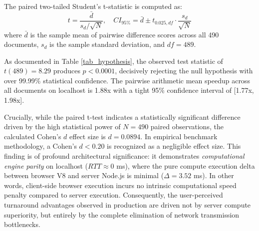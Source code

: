 \documentclass[journal]{IEEEtran}
\begin{document}
The paired two-tailed Student's t-statistic is computed as:
\begin{equation}
t = \frac{\bar{d}}{s_d / \sqrt{N}}, \quad CI_{95\%} = \bar{d} \pm t_{0.025, df} \cdot \frac{s_d}{\sqrt{N}}
\end{equation}
where $\bar{d}$ is the sample mean of pairwise difference scores across all 490 documents, $s_d$ is the sample standard deviation, and $df = 489$.

\begin{table}[!t]
\centering
\caption{Statistical Hypothesis Testing and Speedup Proofs}
\label{tab_hypothesis}
\end{table}

As documented in Table \ref{tab_hypothesis}, the observed test statistic of $t(489) = 8.29$ produces $p < 0.0001$, decisively rejecting the null hypothesis with over 99.99\% statistical confidence. The pairwise arithmetic mean speedup across all documents on localhost is 1.88x with a tight 95\% confidence interval of [1.77x, 1.98x].

Crucially, while the paired t-test indicates a statistically significant difference driven by the high statistical power of $N=490$ paired observations, the calculated Cohen's $d$ effect size is $d = 0.0894$. In empirical benchmark methodology, a Cohen's $d < 0.20$ is recognized as a negligible effect size. This finding is of profound architectural significance: it demonstrates \textit{computational engine parity} on localhost ($RTT \approx 0$ ms), where the pure compute execution delta between browser V8 and server Node.js is minimal ($\Delta = 3.52$ ms). In other words, client-side browser execution incurs no intrinsic computational speed penalty compared to server execution. Consequently, the user-perceived turnaround advantages observed in production are driven not by server compute superiority, but entirely by the complete elimination of network transmission bottlenecks.
\end{document}
